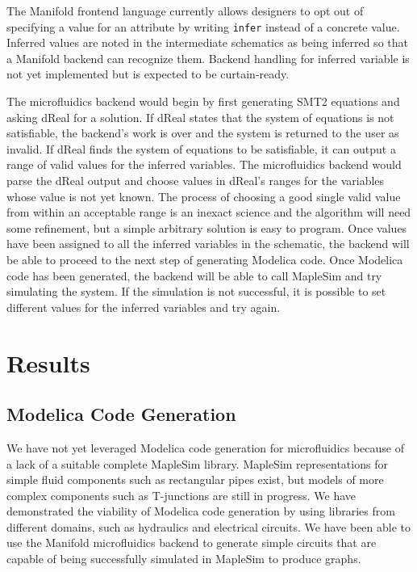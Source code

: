 The Manifold frontend language currently allows designers to opt out of
specifying a value for an attribute by writing {\tt infer} instead of a
concrete value. Inferred values are noted in the intermediate schematics as
being inferred so that a Manifold backend can recognize them. Backend handling
for inferred variable is not yet implemented but is expected to be curtain-ready.

The microfluidics backend would begin by first generating SMT2 equations and asking dReal for a solution.
If dReal states that the system of equations is not satisfiable, the backend's work is over and the system is returned to the user as invalid.
If dReal finds the system of equations to be satisfiable, it can output a range of valid values for the inferred variables.
The microfluidics backend would parse the dReal output and choose values in dReal's ranges for the variables whose value is not yet known.
The process of choosing a good single valid value from within an acceptable range is an inexact science and the algorithm will need some refinement, but a simple arbitrary solution is easy to program.
Once values have been assigned to all the inferred variables in the schematic, the backend will be able to proceed to the next step of generating Modelica code.
Once Modelica code has been generated, the backend will be able to call MapleSim and try simulating the system.
If the simulation is not successful, it is possible to set different values for the inferred variables and try again.

\section{Results}

\subsection{Modelica Code Generation}

We have not yet leveraged Modelica code generation for microfluidics because of a lack of a suitable complete MapleSim library.
MapleSim representations for simple fluid components such as rectangular pipes exist, but models of more complex components such as T-junctions are still in progress.
We have demonstrated the viability of Modelica code generation by using libraries from different domains, such as hydraulics and electrical circuits.
We have been able to use the Manifold microfluidics backend to generate simple circuits that are capable of being successfully simulated in MapleSim to produce graphs.

